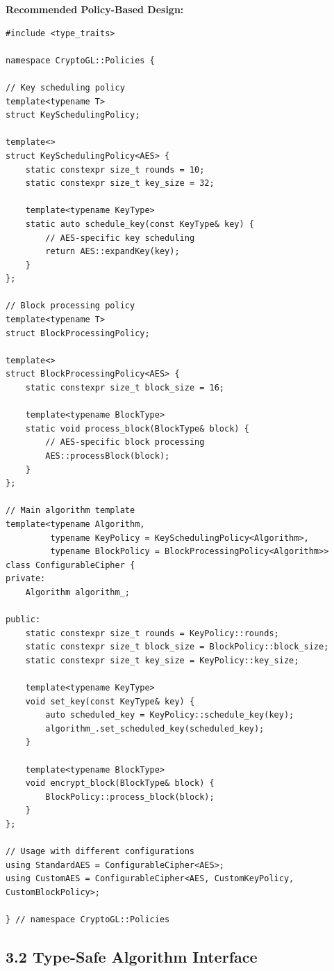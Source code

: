 \documentclass[11pt,a4paper]{article}
\begin{document}
\textbf{Recommended Policy-Based Design:}
\begin{lstlisting}
#include <type_traits>

namespace CryptoGL::Policies {

// Key scheduling policy
template<typename T>
struct KeySchedulingPolicy;

template<>
struct KeySchedulingPolicy<AES> {
    static constexpr size_t rounds = 10;
    static constexpr size_t key_size = 32;
    
    template<typename KeyType>
    static auto schedule_key(const KeyType& key) {
        // AES-specific key scheduling
        return AES::expandKey(key);
    }
};

// Block processing policy
template<typename T>
struct BlockProcessingPolicy;

template<>
struct BlockProcessingPolicy<AES> {
    static constexpr size_t block_size = 16;
    
    template<typename BlockType>
    static void process_block(BlockType& block) {
        // AES-specific block processing
        AES::processBlock(block);
    }
};

// Main algorithm template
template<typename Algorithm, 
         typename KeyPolicy = KeySchedulingPolicy<Algorithm>,
         typename BlockPolicy = BlockProcessingPolicy<Algorithm>>
class ConfigurableCipher {
private:
    Algorithm algorithm_;
    
public:
    static constexpr size_t rounds = KeyPolicy::rounds;
    static constexpr size_t block_size = BlockPolicy::block_size;
    static constexpr size_t key_size = KeyPolicy::key_size;
    
    template<typename KeyType>
    void set_key(const KeyType& key) {
        auto scheduled_key = KeyPolicy::schedule_key(key);
        algorithm_.set_scheduled_key(scheduled_key);
    }
    
    template<typename BlockType>
    void encrypt_block(BlockType& block) {
        BlockPolicy::process_block(block);
    }
};

// Usage with different configurations
using StandardAES = ConfigurableCipher<AES>;
using CustomAES = ConfigurableCipher<AES, CustomKeyPolicy, CustomBlockPolicy>;

} // namespace CryptoGL::Policies
\end{lstlisting}

\subsection{3.2 Type-Safe Algorithm Interface}
\end{document}
